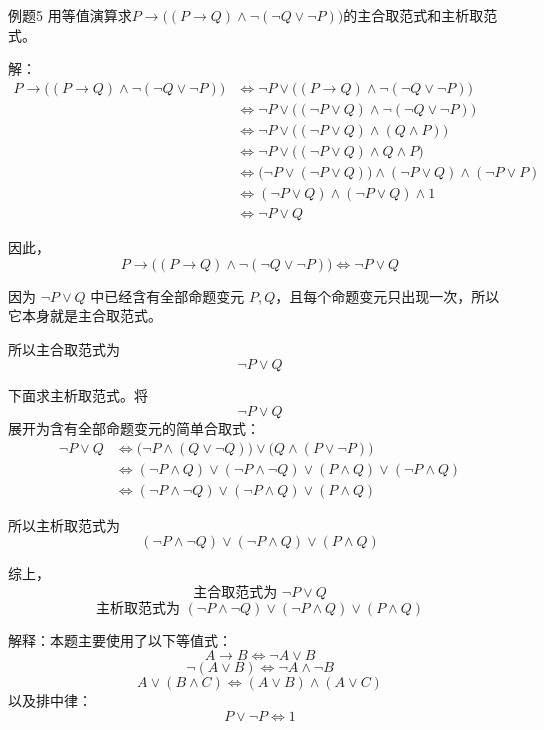 \begin{question}{例题5}
	用等值演算求\(P \to \bigl((P \to Q)\land \neg(\neg Q \lor \neg P)\bigr)\)的主合取范式和主析取范式。
	
	解：
	\begin{align*}
		P \to \bigl((P \to Q)\land \neg(\neg Q \lor \neg P)\bigr)
		&\Leftrightarrow \neg P \lor \bigl((P \to Q)\land \neg(\neg Q \lor \neg P)\bigr) \\
		&\Leftrightarrow \neg P \lor \bigl((\neg P \lor Q)\land \neg(\neg Q \lor \neg P)\bigr) \\
		&\Leftrightarrow \neg P \lor \bigl((\neg P \lor Q)\land (Q \land P)\bigr) \\
		&\Leftrightarrow \neg P \lor \bigl((\neg P \lor Q)\land Q \land P\bigr) \\
		&\Leftrightarrow \bigl(\neg P \lor (\neg P \lor Q)\bigr)
		\land (\neg P \lor Q)
		\land (\neg P \lor P) \\
		&\Leftrightarrow (\neg P \lor Q)\land(\neg P \lor Q)\land 1 \\
		&\Leftrightarrow \neg P \lor Q
	\end{align*}
	
	因此，
	\[
	P \to \bigl((P \to Q)\land \neg(\neg Q \lor \neg P)\bigr)
	\Leftrightarrow \neg P \lor Q
	\]
	
	因为 \(\neg P \lor Q\) 中已经含有全部命题变元 \(P,Q\)，且每个命题变元只出现一次，所以它本身就是主合取范式。
	
	所以主合取范式为
	\[
	\boxed{\neg P \lor Q}
	\]
	
	下面求主析取范式。将
	\[
	\neg P \lor Q
	\]
	展开为含有全部命题变元的简单合取式：
	\begin{align*}
		\neg P \lor Q
		&\Leftrightarrow \bigl(\neg P \land (Q \lor \neg Q)\bigr)
		\lor \bigl(Q \land (P \lor \neg P)\bigr) \\
		&\Leftrightarrow (\neg P \land Q)\lor(\neg P \land \neg Q)
		\lor(P \land Q)\lor(\neg P \land Q) \\
		&\Leftrightarrow (\neg P \land \neg Q)\lor(\neg P \land Q)\lor(P \land Q)
	\end{align*}
	
	所以主析取范式为
	\[
	\boxed{(\neg P \land \neg Q)\lor(\neg P \land Q)\lor(P \land Q)}
	\]
	
	综上，
	\[
	\boxed{\text{主合取范式为 }\neg P \lor Q}
	\]
	\[
	\boxed{\text{主析取范式为 }(\neg P \land \neg Q)\lor(\neg P \land Q)\lor(P \land Q)}
	\]
	
	解释：本题主要使用了以下等值式：
	\[
	A\to B \Leftrightarrow \neg A\lor B
	\]
	\[
	\neg(A\lor B)\Leftrightarrow \neg A\land \neg B
	\]
	\[
	A\lor(B\land C)\Leftrightarrow (A\lor B)\land(A\lor C)
	\]
	以及排中律：
	\[
	P\lor \neg P \Leftrightarrow 1
	\]
\end{question}

